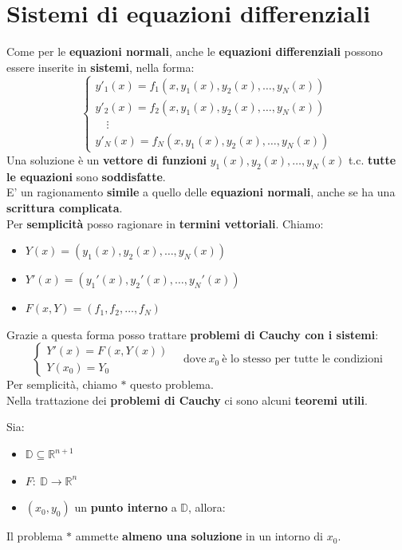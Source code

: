 \documentclass[a4paper, oneside]{article}
\newcommand\R{\mathbb{R}}
\newcommand\D{\mathbb{D}}
\begin{document}
    \section{Sistemi di equazioni differenziali}
    Come per le \textbf{equazioni normali}, anche le \textbf{equazioni differenziali} possono essere inserite in \textbf{sistemi}, nella forma:
    \[\begin{cases}
        y'_1 (x) = f_1\left(x,y_1(x),y_2(x),\ldots,y_N(x)\right)\\
        y'_2 (x) = f_2\left(x,y_1(x),y_2(x),\ldots,y_N(x)\right)\\
        \quad\vdots \\
        y'_N (x) = f_N\left(x,y_1(x),y_2(x),\ldots,y_N(x)\right)
    \end{cases}\]
    Una soluzione è un \textbf{vettore di funzioni} $y_1(x),y_2(x),\ldots,y_N(x)$ t.c. \textbf{tutte le equazioni}
    sono \textbf{soddisfatte}.\\
    E' un ragionamento \textbf{simile} a quello delle \textbf{equazioni normali}, anche se ha una \textbf{scrittura complicata}. \\
    Per \textbf{semplicità} posso ragionare in \textbf{termini vettoriali}. Chiamo:
    \begin{itemize}
        \item $Y(x) = \left(y_1(x),y_2(x),\ldots,y_N(x)\right)$
        \item $Y'(x) = \left(y_1'(x),y_2'(x),\ldots,y_N'(x)\right)$
        \item $F(x,Y) = \left(f_1,f_2,\ldots,f_N\right)$
    \end{itemize}
    Grazie a questa forma posso trattare \textbf{problemi di Cauchy con i sistemi}:
    \[\begin{cases}
        Y'(x) = F(x,Y(x)) \\
        Y(x_0) = Y_0
    \end{cases} \quad \text{dove} \ x_0 \ \text{è lo stesso per tutte le condizioni}\]
    Per semplicità, chiamo \textcircled{$*$} questo problema.\\
    Nella trattazione dei \textbf{problemi di Cauchy} ci sono alcuni \textbf{teoremi utili}.

    \begin{theorem}
        Sia:
        \begin{itemize}
            \item $\D\subseteq\R^{n+1}$
            \item $F: \ \D\to\R^n$
            \item $(x_0,y_0)$ un \textbf{punto interno} a $\D$, allora:
        \end{itemize}
        Il problema \textcircled{$*$} ammette \textbf{almeno una soluzione} in un intorno di $x_0$.
    \end{theorem}
\end{document}
